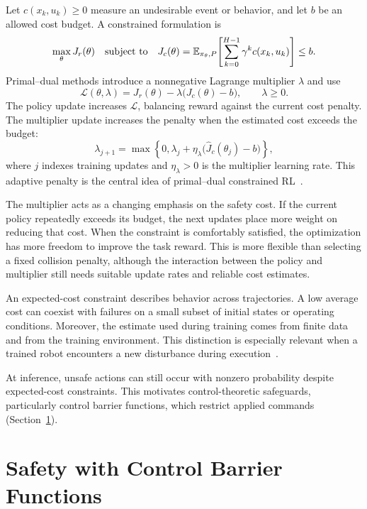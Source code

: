 Let $c(x_k,u_k)\geq0$ measure an undesirable event or behavior, and let $b$ be an allowed cost budget. A constrained formulation is
\begin{equation}
\max_\theta J_r(\theta)\quad\text{subject to}\quad
J_c(\theta)=\mathbb E_{\pi_\theta,P}\!\left[\sum_{k=0}^{H-1}\gamma^k c(x_k,u_k)\right]\leq b.
\label{lit:cmdp}
\end{equation}
Primal--dual methods introduce a nonnegative Lagrange multiplier $\lambda$ and use
\begin{equation}
\mathcal L(\theta,\lambda)=J_r(\theta)-\lambda\bigl(J_c(\theta)-b\bigr),
\qquad\lambda\geq0.
\label{lit:lagrangian}
\end{equation}
The policy update increases $\mathcal L$, balancing reward against the current cost penalty. The multiplier update increases the penalty when the estimated cost exceeds the budget:
\begin{equation}
\lambda_{j+1}=\max\!\left\{0,\lambda_j+\eta_\lambda
\bigl(\widehat J_c(\theta_j)-b\bigr)\right\},
\end{equation}
where $j$ indexes training updates and $\eta_\lambda>0$ is the multiplier learning rate. This adaptive penalty is the central idea of primal--dual constrained RL~\cite{litChamon2019}. 

The multiplier acts as a changing emphasis on the safety cost. If the current policy repeatedly exceeds its budget, the next updates place more weight on reducing that cost. When the constraint is comfortably satisfied, the optimization has more freedom to improve the task reward. This is more flexible than selecting a fixed collision penalty, although the interaction between the policy and multiplier still needs suitable update rates and reliable cost estimates.

An expected-cost constraint describes behavior across trajectories. A low average cost can coexist with failures on a small subset of initial states or operating conditions. Moreover, the estimate used during training comes from finite data and from the training environment. This distinction is especially relevant when a trained robot encounters a new disturbance during execution~\cite{litCPO2017,litChamon2019}.

At inference, unsafe actions can still occur with nonzero probability despite expected-cost constraints. This motivates control-theoretic safeguards, particularly control barrier functions, which restrict applied commands (Section~\ref{ch:cbf}).

\FloatBarrier
\section{Safety with Control Barrier Functions}
\label{ch:cbf}

